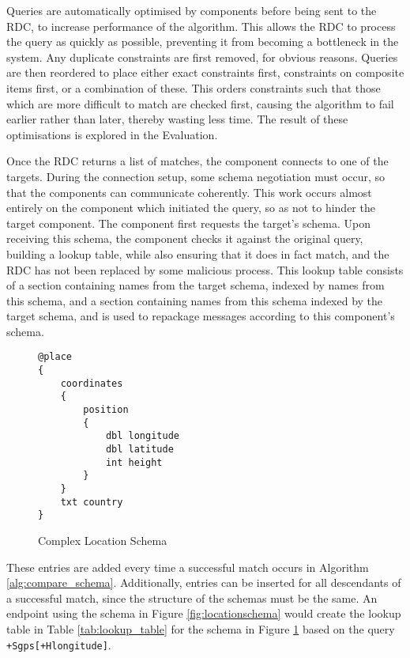 \documentclass[12pt,twoside,notitlepage]{report}
\begin{document}
Queries are automatically optimised by components before being sent to the RDC, to increase performance of the algorithm. This allows the RDC to process the query as quickly as possible, preventing it from becoming a bottleneck in the system. 
Any duplicate constraints are first removed, for obvious reasons. 
Queries are then reordered to place either exact constraints first, constraints on composite items first, or a combination of these. 
This orders constraints such that those which are more difficult to match are checked first, causing the algorithm to fail earlier rather than later, thereby wasting less time. 
The result of these optimisations is explored in the Evaluation. 



Once the RDC returns a list of matches, the component connects to one of the targets. 
During the connection setup, some schema negotiation must occur, so that the components can communicate coherently. 
This work occurs almost entirely on the component which initiated the query, so as not to hinder the target component. 
The component first requests the target's schema. 
Upon receiving this schema, the component checks it against the original query, building a lookup table, while also ensuring that it does in fact match, and the RDC has not been replaced by some malicious process. 
This lookup table consists of a section containing names from the target schema, indexed by names from this schema, and a section containing names from this schema indexed by the target schema, and is used to repackage messages according to this component's schema. 

\begin{figure}[tbh]
\begin{lstlisting}
@place
{
	coordinates
	{
		position
		{
			dbl longitude
			dbl latitude
			int height
		}
	}
	txt country
}
\end{lstlisting}
\caption{Complex Location Schema}
\label{fig:complexlocationschema}
\end{figure}
 
These entries are added every time a successful match occurs in Algorithm \ref{alg:compare_schema}. 
Additionally, entries can be inserted for all descendants of a successful match, since the structure of the schemas must be the same. 
An endpoint using the schema in Figure \ref{fig:locationschema} would create the lookup table in Table \ref{tab:lookup_table} for the schema in Figure \ref{fig:complexlocationschema} based on the query {\tt +Sgps[+Hlongitude]}.
\end{document}
